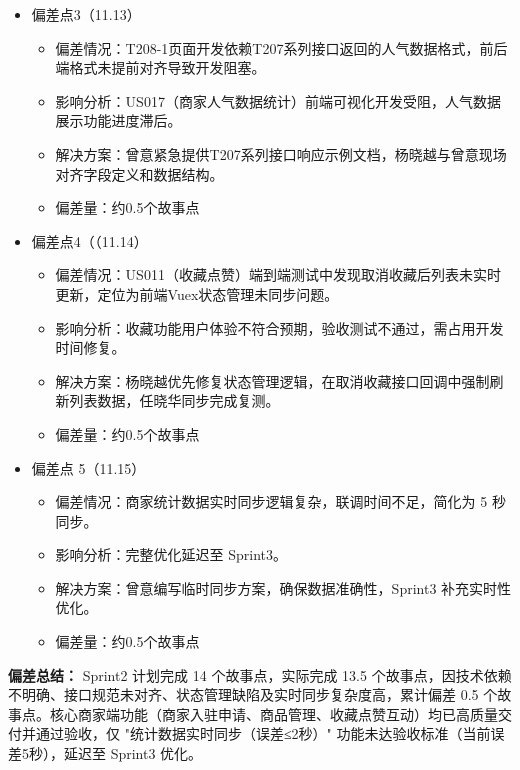 \begin{levellist}
\begin{enumerate}
\begin{itemize}
                  \item 偏差点3（11.13）
                        \begin{itemize}
                            \item 偏差情况：T208-1页面开发依赖T207系列接口返回的人气数据格式，前后端格式未提前对齐导致开发阻塞。
                            \item 影响分析：US017（商家人气数据统计）前端可视化开发受阻，人气数据展示功能进度滞后。
                            \item 解决方案：曾意紧急提供T207系列接口响应示例文档，杨晓越与曾意现场对齐字段定义和数据结构。
                            \item 偏差量：约0.5个故事点
                        \end{itemize}

                  \item 偏差点4（（11.14）
                        \begin{itemize}
                            \item 偏差情况：US011（收藏点赞）端到端测试中发现取消收藏后列表未实时更新，定位为前端Vuex状态管理未同步问题。
                            \item 影响分析：收藏功能用户体验不符合预期，验收测试不通过，需占用开发时间修复。
                            \item 解决方案：杨晓越优先修复状态管理逻辑，在取消收藏接口回调中强制刷新列表数据，任晓华同步完成复测。
                            \item 偏差量：约0.5个故事点
                        \end{itemize}

                  \item 偏差点 5（11.15）
                        \begin{itemize}
                            \item 偏差情况：商家统计数据实时同步逻辑复杂，联调时间不足，简化为 5 秒同步。
                            \item 影响分析：完整优化延迟至 Sprint3。
                            \item 解决方案：曾意编写临时同步方案，确保数据准确性，Sprint3 补充实时性优化。
                            \item 偏差量：约0.5个故事点
                        \end{itemize}

              \end{itemize}

    \end{enumerate}
    \textbf{偏差总结：} Sprint2 计划完成 14 个故事点，实际完成 13.5 个故事点，因技术依赖不明确、接口规范未对齐、状态管理缺陷及实时同步复杂度高，累计偏差 0.5 个故事点。核心商家端功能（商家入驻申请、商品管理、收藏点赞互动）均已高质量交付并通过验收，仅 "统计数据实时同步（误差≤2秒）" 功能未达验收标准（当前误差5秒），延迟至 Sprint3 优化。

\end{levellist}



